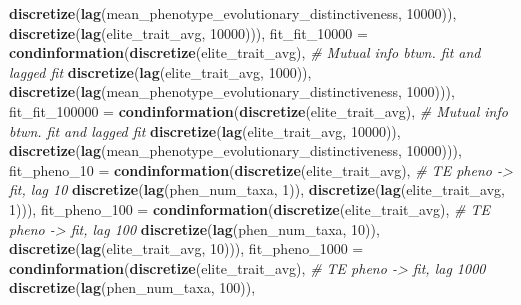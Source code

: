 \documentclass[]{book}
\newenvironment{Shaded}{\begin{snugshade}}{\end{snugshade}}
\newcommand{\CommentTok}[1]{\textcolor[rgb]{0.56,0.35,0.01}{\textit{#1}}}
\newcommand{\DataTypeTok}[1]{\textcolor[rgb]{0.13,0.29,0.53}{#1}}
\newcommand{\DecValTok}[1]{\textcolor[rgb]{0.00,0.00,0.81}{#1}}
\newcommand{\KeywordTok}[1]{\textcolor[rgb]{0.13,0.29,0.53}{\textbf{#1}}}
\newcommand{\NormalTok}[1]{#1}
\begin{document}
\begin{Shaded}
\begin{Highlighting}[]
{                                     \KeywordTok{discretize}\NormalTok{(}\KeywordTok{lag}\NormalTok{(mean_phenotype_evolutionary_distinctiveness, }\DecValTok{10000}\NormalTok{)), }
                                     \KeywordTok{discretize}\NormalTok{(}\KeywordTok{lag}\NormalTok{(elite_trait_avg, }\DecValTok{10000}\NormalTok{))),  }
  \DataTypeTok{fit_fit_10000 =}    \KeywordTok{condinformation}\NormalTok{(}\KeywordTok{discretize}\NormalTok{(elite_trait_avg), }\CommentTok{# Mutual info btwn. fit and lagged fit}
                                     \KeywordTok{discretize}\NormalTok{(}\KeywordTok{lag}\NormalTok{(elite_trait_avg, }\DecValTok{1000}\NormalTok{)), }
                                     \KeywordTok{discretize}\NormalTok{(}\KeywordTok{lag}\NormalTok{(mean_phenotype_evolutionary_distinctiveness, }\DecValTok{1000}\NormalTok{))),}
  \DataTypeTok{fit_fit_100000 =}   \KeywordTok{condinformation}\NormalTok{(}\KeywordTok{discretize}\NormalTok{(elite_trait_avg), }\CommentTok{# Mutual info btwn. fit and lagged fit}
                                     \KeywordTok{discretize}\NormalTok{(}\KeywordTok{lag}\NormalTok{(elite_trait_avg, }\DecValTok{10000}\NormalTok{)), }
                                     \KeywordTok{discretize}\NormalTok{(}\KeywordTok{lag}\NormalTok{(mean_phenotype_evolutionary_distinctiveness, }\DecValTok{10000}\NormalTok{))),  }
  \DataTypeTok{fit_pheno_10 =}     \KeywordTok{condinformation}\NormalTok{(}\KeywordTok{discretize}\NormalTok{(elite_trait_avg), }\CommentTok{# TE pheno -> fit, lag 10}
                                     \KeywordTok{discretize}\NormalTok{(}\KeywordTok{lag}\NormalTok{(phen_num_taxa, }\DecValTok{1}\NormalTok{)), }
                                     \KeywordTok{discretize}\NormalTok{(}\KeywordTok{lag}\NormalTok{(elite_trait_avg, }\DecValTok{1}\NormalTok{))),}
  \DataTypeTok{fit_pheno_100 =}    \KeywordTok{condinformation}\NormalTok{(}\KeywordTok{discretize}\NormalTok{(elite_trait_avg),  }\CommentTok{# TE pheno -> fit, lag 100 }
                                     \KeywordTok{discretize}\NormalTok{(}\KeywordTok{lag}\NormalTok{(phen_num_taxa, }\DecValTok{10}\NormalTok{)), }
                                     \KeywordTok{discretize}\NormalTok{(}\KeywordTok{lag}\NormalTok{(elite_trait_avg, }\DecValTok{10}\NormalTok{))),}
  \DataTypeTok{fit_pheno_1000 =}   \KeywordTok{condinformation}\NormalTok{(}\KeywordTok{discretize}\NormalTok{(elite_trait_avg),  }\CommentTok{# TE pheno -> fit, lag 1000}
                                     \KeywordTok{discretize}\NormalTok{(}\KeywordTok{lag}\NormalTok{(phen_num_taxa, }\DecValTok{100}\NormalTok{)), }
}
\end{Highlighting}
\end{Shaded}
\end{document}
